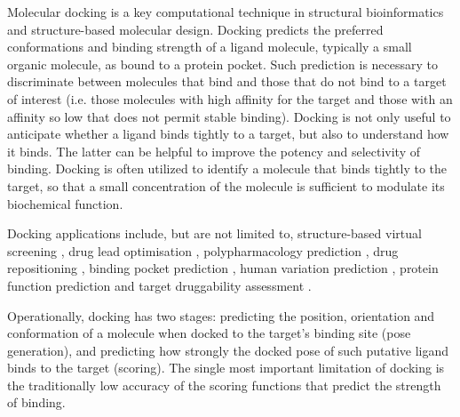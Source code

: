 Molecular docking is a key computational technique in structural bioinformatics and structure-based molecular design. Docking predicts the preferred conformations and binding strength of a ligand molecule, typically a small organic molecule, as bound to a protein pocket. Such prediction is necessary to discriminate between molecules that bind and those that do not bind to a target of interest (i.e. those molecules with high affinity for the target and those with an affinity so low that does not permit stable binding). Docking is not only useful to anticipate whether a ligand binds tightly to a target, but also to understand how it binds. The latter can be helpful to improve the potency and selectivity of binding. Docking is often utilized to identify a molecule that binds tightly to the target, so that a small concentration of the molecule is sufficient to modulate its biochemical function.

Docking applications include, but are not limited to, structure-based virtual screening \citep{455,1383,1448}, drug lead optimisation \citep{1385}, polypharmacology prediction \citep{1449,1450}, drug repositioning \citep{1384}, binding pocket prediction \citep{384,1217}, human variation prediction \citep{1451}, protein function prediction \citep{1386} and target druggability assessment \citep{1472}.

Operationally, docking has two stages: predicting the position, orientation and conformation of a molecule when docked to the target's binding site (pose generation), and predicting how strongly the docked pose of such putative ligand binds to the target (scoring). The single most important limitation of docking is the traditionally low accuracy of the scoring functions that predict the strength of binding.

